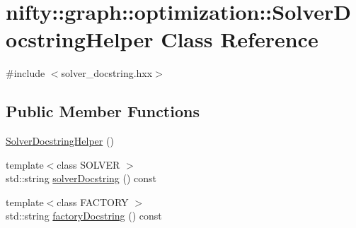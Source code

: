\hypertarget{classnifty_1_1graph_1_1optimization_1_1SolverDocstringHelper}{}\section{nifty\+:\+:graph\+:\+:optimization\+:\+:Solver\+Docstring\+Helper Class Reference}
\label{classnifty_1_1graph_1_1optimization_1_1SolverDocstringHelper}


{\ttfamily \#include $<$solver\+\_\+docstring.\+hxx$>$}

\subsection*{Public Member Functions}
\begin{DoxyCompactItemize}
\item 
\hyperlink{classnifty_1_1graph_1_1optimization_1_1SolverDocstringHelper_a05728e75bb9cbabe2a3a1bd1ae5774e1}{Solver\+Docstring\+Helper} ()
\item 
{\footnotesize template$<$class S\+O\+L\+V\+E\+R $>$ }\\std\+::string \hyperlink{classnifty_1_1graph_1_1optimization_1_1SolverDocstringHelper_a794e86a248f308ad06f384dc6945fba6}{solver\+Docstring} () const 
\item 
{\footnotesize template$<$class F\+A\+C\+T\+O\+R\+Y $>$ }\\std\+::string \hyperlink{classnifty_1_1graph_1_1optimization_1_1SolverDocstringHelper_a914cde84ecd596245cf85256a52bb846}{factory\+Docstring} () const 
\end{DoxyCompactItemize}
